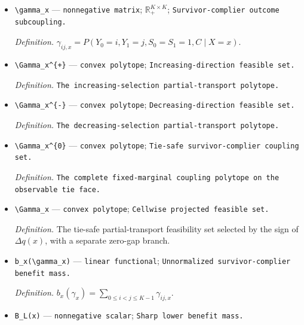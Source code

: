 \documentclass{article}
\begin{document}
\begin{itemize}
  \par\smallskip\noindent\emph{Definition.} \(m(x)=\min\{q_0(x),q_1(x)\}\).
  \item \texttt{\textbackslash{}\allowbreak{}gamma\_\allowbreak{}x} --- \texttt{nonnegative matrix}; \(\mathbb R_+^{K\times K}\); \texttt{Survivor-\allowbreak{}complier outcome subcoupling.}
  \par\smallskip\noindent\emph{Definition.} \(\gamma_{ij,x}=P(Y_0=i,Y_1=j,S_0=S_1=1,C\mid X=x)\).
  \item \texttt{\textbackslash{}\allowbreak{}Gamma\_\allowbreak{}x\textasciicircum{}\{+\allowbreak{}\}\allowbreak{}} --- \texttt{convex polytope}; \texttt{Increasing-\allowbreak{}direction feasible set.}
  \par\smallskip\noindent\emph{Definition.} \texttt{The increasing-\allowbreak{}selection partial-\allowbreak{}transport polytope.}
  \item \texttt{\textbackslash{}\allowbreak{}Gamma\_\allowbreak{}x\textasciicircum{}\{-\allowbreak{}\}\allowbreak{}} --- \texttt{convex polytope}; \texttt{Decreasing-\allowbreak{}direction feasible set.}
  \par\smallskip\noindent\emph{Definition.} \texttt{The decreasing-\allowbreak{}selection partial-\allowbreak{}transport polytope.}
  \item \texttt{\textbackslash{}\allowbreak{}Gamma\_\allowbreak{}x\textasciicircum{}\{0\}\allowbreak{}} --- \texttt{convex polytope}; \texttt{Tie-\allowbreak{}safe survivor-\allowbreak{}complier coupling set.}
  \par\smallskip\noindent\emph{Definition.} \texttt{The complete fixed-\allowbreak{}marginal coupling polytope on the observable tie face.}
  \item \texttt{\textbackslash{}\allowbreak{}Gamma\_\allowbreak{}x} --- \texttt{convex polytope}; \texttt{Cellwise projected feasible set.}
  \par\smallskip\noindent\emph{Definition.} The tie-safe partial-transport feasibility set selected by the sign of \(\Delta q(x)\), with a separate zero-gap branch.
  \item \texttt{b\_\allowbreak{}x(\textbackslash{}\allowbreak{}gamma\_\allowbreak{}x)} --- \texttt{linear functional}; \texttt{Unnormalized survivor-\allowbreak{}complier benefit mass.}
  \par\smallskip\noindent\emph{Definition.} \(b_x(\gamma_x)=\sum_{0\le i<j\le K-1}\gamma_{ij,x}\).
  \item \texttt{B\_\allowbreak{}L(x)} --- \texttt{nonnegative scalar}; \texttt{Sharp lower benefit mass.}

\end{itemize}
\end{document}
